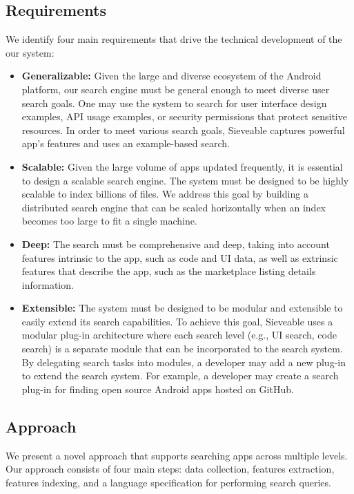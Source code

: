 \subsection{Requirements}
We identify four main requirements that drive the technical development of the our system:
\begin{itemize}
	\item \textbf{Generalizable:}
	Given the large and diverse ecosystem of the Android platform, our search engine must be general enough to meet diverse user search goals.
	One may use the system to search for user interface design examples, API usage examples, or security permissions that protect sensitive resources.
	In order to meet various search goals, Sieveable captures powerful app's features and uses an example-based search.
	
	\item \textbf{Scalable:}
	Given the large volume of apps updated frequently, it is essential to design a scalable search engine.
	The system must be designed to be highly scalable to index billions of files. We address this goal by building a distributed search engine that can be scaled horizontally when an index becomes too large to fit a single machine.
	\item \textbf{Deep:}
	The search must be comprehensive and deep, taking into account features intrinsic to the app, such as code and UI data, as well as extrinsic features that describe the app, such as the marketplace listing details information.
	
	\item \textbf{Extensible:}
	The system must be designed to be modular and extensible to easily extend its search capabilities.
	To achieve this goal, Sieveable uses a modular plug-in architecture where each search level (e.g., UI search, code search) is a separate module that can be incorporated to the search system.
	By delegating search tasks into modules, a developer may add a new plug-in to extend the search system.
	For example, a developer may create a search plug-in for finding open source Android apps hosted on GitHub.
\end{itemize}

\subsection{Approach}
We present a novel approach that supports searching apps across multiple levels.
Our approach consists of four main steps: data collection, features extraction, features indexing, and a language specification for performing search queries.

